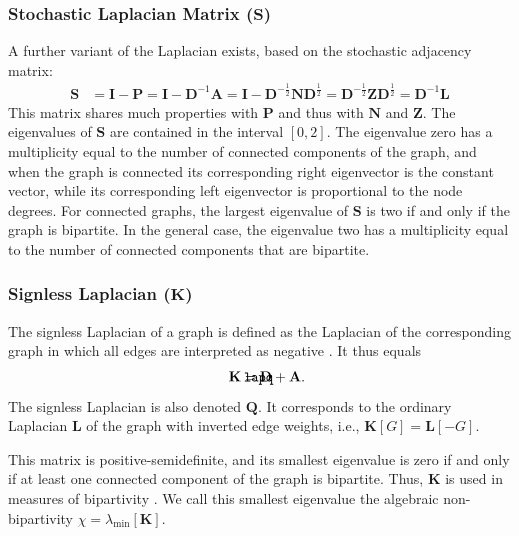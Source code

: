 \documentclass{article}
\def\mathnote#1{%
  \tag*{\rlap{\hspace\marginparsep\smash{\parbox[t]{\marginparwidth}{#1}}}}
}
\begin{document}
\subsubsection{Stochastic Laplacian Matrix ($\mathbf S$)}
\label{sec:matrix.S}
A further variant of the Laplacian exists, based on the stochastic
adjacency matrix:
\begin{align}
  \mathbf S &= \mathbf I - \mathbf P = \mathbf I - \mathbf D^{-1}
  \mathbf A = \mathbf I - \mathbf D^{-\frac 1 2} \mathbf N \mathbf D^{\frac 1 2} =
  \mathbf D^{-\frac 1 2} \mathbf Z \mathbf D^{\frac 1 2}
  = \mathbf D^{-1} \mathbf L
\end{align}
This matrix shares much properties with $\mathbf P$ and thus with
$\mathbf N$ and $\mathbf Z$.  The eigenvalues of $\mathbf S$ are
contained in the interval $[0, 2]$.  The eigenvalue zero has a
multiplicity equal to the number of connected components of the graph,
and when the graph is connected its corresponding right eigenvector is the
constant vector, while its corresponding left eigenvector is
proportional to the node degrees.  For connected graphs, the largest
eigenvalue of $\mathbf S$ is two if and only if the graph is bipartite.
In the general case, the eigenvalue two has a multiplicity equal to the
number of connected components that are bipartite. 

\subsubsection{Signless Laplacian ($\mathbf K$)}
\label{sec:signless-laplacian}
\label{sec:matrix.K}
\label{sec:matrix.C}
\label{sec:matrix.J}
The signless Laplacian of a graph is defined as the Laplacian of the
corresponding graph in which all edges are interpreted as negative \citep{b900}.  It
thus equals
\begin{align}
  \mathnote{\texttt{lapq}}
  \mathbf K &= \mathbf D + \mathbf A.
\end{align}
The signless Laplacian is also denoted $\mathbf Q$. 
It corresponds to the ordinary Laplacian
$\mathbf L$ of the graph with inverted edge weights, i.e., $\mathbf K[G] =
\mathbf L[-G]$. 

This matrix is positive-semidefinite, and its smallest eigenvalue is
zero if and only if at least one connected component of the graph is bipartite.  Thus, $\mathbf K$ is used
in measures of bipartivity \citep[see e.g.][]{kunegis:bipartivity}.   We
call this smallest eigenvalue the algebraic non-bipartivity $\chi =
\lambda_{\min}[\mathbf K]$. 
\end{document}
